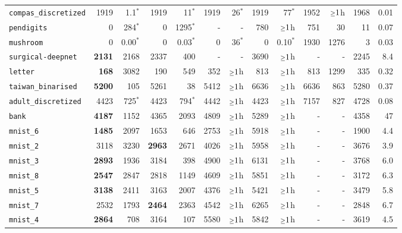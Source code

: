 \begin{tabular}{lrrrrrrrrrrrr}
\texttt{compas\_discretized} & 1919 & 1.1$^*$ & 1919 & 11$^*$ & 1919 & 26$^*$ & 1919 & 77$^*$ & 1952 & $\mathsmaller{\geq}1$h & 1968 & 0.01\\
\texttt{pendigits} & 0 & 284$^*$ & 0 & 1295$^*$ & - & - & 780 & $\mathsmaller{\geq}1$h & 751 & 30 & 11 & 0.07\\
\texttt{mushroom} & 0 & 0.00$^*$ & 0 & 0.03$^*$ & 0 & 36$^*$ & 0 & 0.10$^*$ & 1930 & 1276 & 3 & 0.03\\
\texttt{surgical-deepnet} & \textbf{2131} & 2168 & 2337 & 400 & - & - & 3690 & $\mathsmaller{\geq}1$h & - & - & 2245 & 8.4\\
\texttt{letter} & \textbf{168} & 3082 & 190 & 549 & 352 & $\mathsmaller{\geq}1$h & 813 & $\mathsmaller{\geq}1$h & 813 & 1299 & 335 & 0.32\\
\texttt{taiwan\_binarised} & \textbf{5200} & 105 & 5261 & 38 & 5412 & $\mathsmaller{\geq}1$h & 6636 & $\mathsmaller{\geq}1$h & 6636 & 863 & 5280 & 0.37\\
\texttt{adult\_discretized} & 4423 & 725$^*$ & 4423 & 794$^*$ & 4442 & $\mathsmaller{\geq}1$h & 4423 & $\mathsmaller{\geq}1$h & 7157 & 827 & 4728 & 0.08\\
\texttt{bank} & \textbf{4187} & 1152 & 4365 & 2093 & 4809 & $\mathsmaller{\geq}1$h & 5289 & $\mathsmaller{\geq}1$h & - & - & 4358 & 47\\
\texttt{mnist\_6} & \textbf{1485} & 2097 & 1653 & 646 & 2753 & $\mathsmaller{\geq}1$h & 5918 & $\mathsmaller{\geq}1$h & - & - & 1900 & 4.4\\
\texttt{mnist\_2} & 3118 & 3230 & \textbf{2963} & 2671 & 4026 & $\mathsmaller{\geq}1$h & 5958 & $\mathsmaller{\geq}1$h & - & - & 3676 & 3.9\\
\texttt{mnist\_3} & \textbf{2893} & 1936 & 3184 & 398 & 4900 & $\mathsmaller{\geq}1$h & 6131 & $\mathsmaller{\geq}1$h & - & - & 3768 & 6.0\\
\texttt{mnist\_8} & \textbf{2547} & 2847 & 2818 & 1149 & 4609 & $\mathsmaller{\geq}1$h & 5851 & $\mathsmaller{\geq}1$h & - & - & 3172 & 6.3\\
\texttt{mnist\_5} & \textbf{3138} & 2411 & 3163 & 2007 & 4376 & $\mathsmaller{\geq}1$h & 5421 & $\mathsmaller{\geq}1$h & - & - & 3479 & 5.8\\
\texttt{mnist\_7} & 2532 & 1793 & \textbf{2464} & 2363 & 4542 & $\mathsmaller{\geq}1$h & 6265 & $\mathsmaller{\geq}1$h & - & - & 2848 & 6.7\\
\texttt{mnist\_4} & \textbf{2864} & 708 & 3164 & 107 & 5580 & $\mathsmaller{\geq}1$h & 5842 & $\mathsmaller{\geq}1$h & - & - & 3619 & 4.5\\

\end{tabular}
